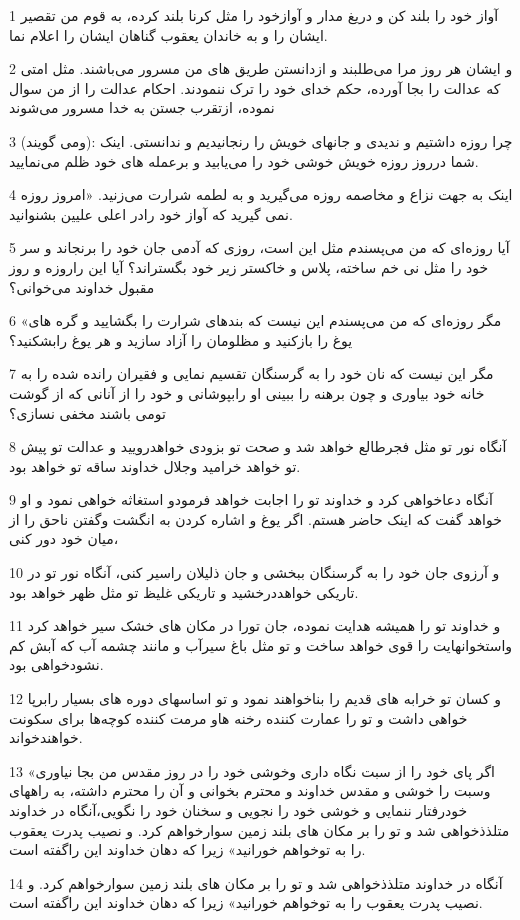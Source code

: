 \par 1 آواز خود را بلند کن و دریغ مدار و آوازخود را مثل کرنا بلند کرده، به قوم من تقصیر ایشان را و به خاندان یعقوب گناهان ایشان را اعلام نما.
\par 2 و ایشان هر روز مرا می‌طلبند و ازدانستن طریق های من مسرور می‌باشند. مثل امتی که عدالت را بجا آورده، حکم خدای خود را ترک ننمودند. احکام عدالت را از من سوال نموده، ازتقرب جستن به خدا مسرور می‌شوند
\par 3 (ومی گویند): چرا روزه داشتیم و ندیدی و جانهای خویش را رنجانیدیم و ندانستی. اینک شما درروز روزه خویش خوشی خود را می‌یابید و برعمله های خود ظلم می‌نمایید.
\par 4 اینک به جهت نزاع و مخاصمه روزه می‌گیرید و به لطمه شرارت می‌زنید. «امروز روزه نمی گیرید که آواز خود رادر اعلی علیین بشنوانید.
\par 5 آیا روزه‌ای که من می‌پسندم مثل این است، روزی که آدمی جان خود را برنجاند و سر خود را مثل نی خم ساخته، پلاس و خاکستر زیر خود بگستراند؟ آیا این راروزه و روز مقبول خداوند می‌خوانی؟
\par 6 «مگر روزه‌ای که من می‌پسندم این نیست که بندهای شرارت را بگشایید و گره های یوغ را بازکنید و مظلومان را آزاد سازید و هر یوغ رابشکنید؟ 
\par 7 مگر این نیست که نان خود را به گرسنگان تقسیم نمایی و فقیران رانده شده را به خانه خود بیاوری و چون برهنه را ببینی او رابپوشانی و خود را از آنانی که از گوشت تومی باشند مخفی نسازی؟
\par 8 آنگاه نور تو مثل فجرطالع خواهد شد و صحت تو بزودی خواهدرویید و عدالت تو پیش تو خواهد خرامید وجلال خداوند ساقه تو خواهد بود.
\par 9 آنگاه دعاخواهی کرد و خداوند تو را اجابت خواهد فرمودو استغاثه خواهی نمود و او خواهد گفت که اینک حاضر هستم. اگر یوغ و اشاره کردن به انگشت وگفتن ناحق را از میان خود دور کنی،
\par 10 و آرزوی جان خود را به گرسنگان ببخشی و جان ذلیلان راسیر کنی، آنگاه نور تو در تاریکی خواهددرخشید و تاریکی غلیظ تو مثل ظهر خواهد بود.
\par 11 و خداوند تو را همیشه هدایت نموده، جان تورا در مکان های خشک سیر خواهد کرد واستخوانهایت را قوی خواهد ساخت و تو مثل باغ سیرآب و مانند چشمه آب که آبش کم نشودخواهی بود.
\par 12 و کسان تو خرابه های قدیم را بناخواهند نمود و تو اساسهای دوره های بسیار رابرپا خواهی داشت و تو را عمارت کننده رخنه هاو مرمت کننده کوچه‌ها برای سکونت خواهندخواند.
\par 13 «اگر پای خود را از سبت نگاه داری وخوشی خود را در روز مقدس من بجا نیاوری وسبت را خوشی و مقدس خداوند و محترم بخوانی و آن را محترم داشته، به راههای خودرفتار ننمایی و خوشی خود را نجویی و سخنان خود را نگویی،آنگاه در خداوند متلذذخواهی شد و تو را بر مکان های بلند زمین سوارخواهم کرد. و نصیب پدرت یعقوب را به توخواهم خورانید» زیرا که دهان خداوند این راگفته است.
\par 14 آنگاه در خداوند متلذذخواهی شد و تو را بر مکان های بلند زمین سوارخواهم کرد. و نصیب پدرت یعقوب را به توخواهم خورانید» زیرا که دهان خداوند این راگفته است.
 
